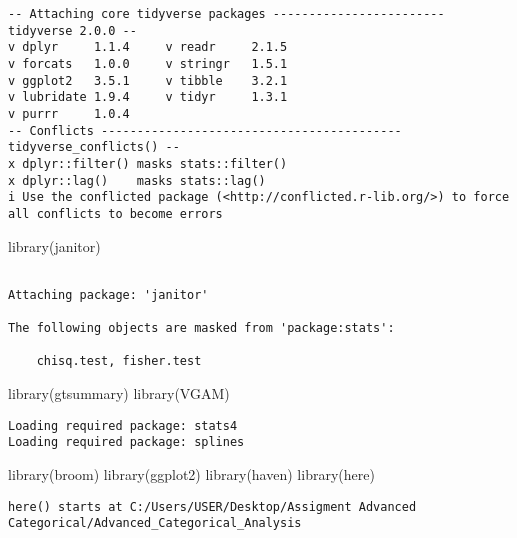\documentclass[
  letterpaper,
  DIV=11,
  numbers=noendperiod]{scrartcl}
\newenvironment{Shaded}{\begin{snugshade}}{\end{snugshade}}
\newcommand{\FunctionTok}[1]{\textcolor[rgb]{0.28,0.35,0.67}{#1}}
\newcommand{\NormalTok}[1]{\textcolor[rgb]{0.00,0.23,0.31}{#1}}
\begin{document}
\begin{verbatim}
-- Attaching core tidyverse packages ------------------------ tidyverse 2.0.0 --
v dplyr     1.1.4     v readr     2.1.5
v forcats   1.0.0     v stringr   1.5.1
v ggplot2   3.5.1     v tibble    3.2.1
v lubridate 1.9.4     v tidyr     1.3.1
v purrr     1.0.4     
-- Conflicts ------------------------------------------ tidyverse_conflicts() --
x dplyr::filter() masks stats::filter()
x dplyr::lag()    masks stats::lag()
i Use the conflicted package (<http://conflicted.r-lib.org/>) to force all conflicts to become errors
\end{verbatim}

\begin{Shaded}
\begin{Highlighting}[]
\FunctionTok{library}\NormalTok{(janitor)}
\end{Highlighting}
\end{Shaded}

\begin{verbatim}

Attaching package: 'janitor'

The following objects are masked from 'package:stats':

    chisq.test, fisher.test
\end{verbatim}

\begin{Shaded}
\begin{Highlighting}[]
\FunctionTok{library}\NormalTok{(gtsummary)}
\FunctionTok{library}\NormalTok{(VGAM)}
\end{Highlighting}
\end{Shaded}

\begin{verbatim}
Loading required package: stats4
Loading required package: splines
\end{verbatim}

\begin{Shaded}
\begin{Highlighting}[]
\FunctionTok{library}\NormalTok{(broom)}
\FunctionTok{library}\NormalTok{(ggplot2)}
\FunctionTok{library}\NormalTok{(haven)}
\FunctionTok{library}\NormalTok{(here)}
\end{Highlighting}
\end{Shaded}

\begin{verbatim}
here() starts at C:/Users/USER/Desktop/Assigment Advanced Categorical/Advanced_Categorical_Analysis
\end{verbatim}
\end{document}
